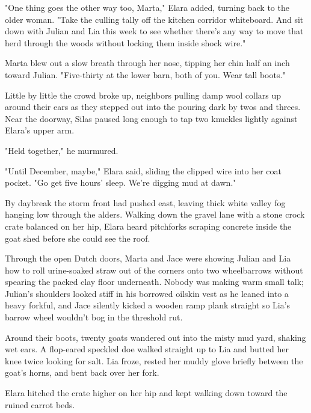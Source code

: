 "One thing goes the other way too, Marta," Elara added, turning back to the older woman. "Take the culling tally off the kitchen corridor whiteboard. And sit down with Julian and Lia this week to see whether there's any way to move that herd through the woods without locking them inside shock wire."

Marta blew out a slow breath through her nose, tipping her chin half an inch toward Julian. "Five-thirty at the lower barn, both of you. Wear tall boots."

Little by little the crowd broke up, neighbors pulling damp wool collars up around their ears as they stepped out into the pouring dark by twos and threes. Near the doorway, Silas paused long enough to tap two knuckles lightly against Elara's upper arm.

"Held together," he murmured.

"Until December, maybe," Elara said, sliding the clipped wire into her coat pocket. "Go get five hours' sleep. We're digging mud at dawn."

\bigskip

By daybreak the storm front had pushed east, leaving thick white valley fog hanging low through the alders. Walking down the gravel lane with a stone crock crate balanced on her hip, Elara heard pitchforks scraping concrete inside the goat shed before she could see the roof.

Through the open Dutch doors, Marta and Jace were showing Julian and Lia how to roll urine-soaked straw out of the corners onto two wheelbarrows without spearing the packed clay floor underneath. Nobody was making warm small talk; Julian's shoulders looked stiff in his borrowed oilskin vest as he leaned into a heavy forkful, and Jace silently kicked a wooden ramp plank straight so Lia's barrow wheel wouldn't bog in the threshold rut.

Around their boots, twenty goats wandered out into the misty mud yard, shaking wet ears. A flop-eared speckled doe walked straight up to Lia and butted her knee twice looking for salt. Lia froze, rested her muddy glove briefly between the goat's horns, and bent back over her fork.

Elara hitched the crate higher on her hip and kept walking down toward the ruined carrot beds.
